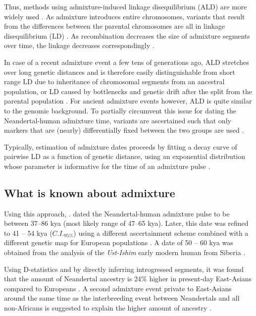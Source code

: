 \documentclass[]{article}
\begin{document}
Thus, methods using admixture-induced linkage disequilibrium (ALD) are more widely used \citep{moorjani_history_2011,sankararaman_date_2012,sankararaman_combined_2016}. As admixture introduces entire chromosomes, variants that result from the differences between the parental chromosomes are all in linkage disequilibrium (LD) \citep{chakraborty_admixture_1988,stephens_mapping_1994,wall_detecting_2000}. As recombination decreases the size of admixture segments over time, the linkage decreases correspondingly \citep{patterson_methods_2004}. 

In case of a recent admixture event a few tens of generations ago, ALD stretches  over long genetic distances and is therefore easily distinguishable from short range LD due to inheritance of chromosomal segments from an ancestral population, or LD caused by bottlenecks and genetic drift after the split from the parental population \citep{moorjani_history_2011}. For ancient admixture events however, ALD is quite similar to the genomic background. To partially circumvent this issue for dating the Neandertal-human admixture time, variants are ascertained such that only  markers that are (nearly) differentially fixed between the two groups are used 
\citep{sankararaman_date_2012}. 

Typically, estimation of admixture dates proceeds by fitting a decay curve of pairwise LD as a function of genetic distance, using an exponential distribution whose parameter is informative for the time of an admixture pulse \citep{moorjani_history_2011,loh_inferring_2013}. 



\subsection{What is known about admixture}

Using this approach,   \cite{sankararaman_date_2012}. dated the Neandertal-human admixture pulse to be  between 37--86 kya (most likely range of 47–65 kya). Later, this date was refined to 41 -- 54 kya ($C.I._{95\%}$) using a different ascertainment scheme combined with a different genetic map for European populations \citep{moorjani_genetic_2016}. A date of 50 -- 60 kya was obtained from the analysis of the \textit{Ust-Ishim} early modern human from Siberia \citep{fu_genome_2014}.

Using D-statistics \citep{green_draft_2010} and by directly inferring introgressed segments, it was found that the amount of Neandertal ancestry is 24\% higher in present-day East-Asians compared to Europeans \citep{meyer_high-coverage_2012,  wall_higher_2013}. A second admixture event private to East-Asians around the same time as the interbreeding event between Neandertals and all non-Africans is suggested to explain the higher amount of ancestry \citep{kim_selection_2015,vernot_complex_2015}.
\end{document}
